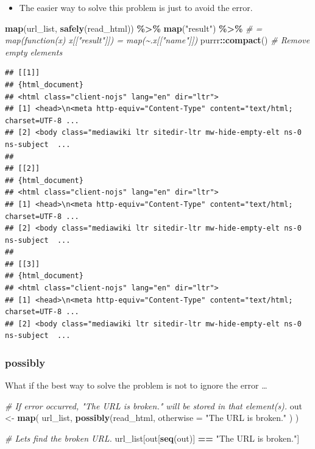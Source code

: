 \documentclass[
]{book}
\newenvironment{Shaded}{\begin{snugshade}}{\end{snugshade}}
\newcommand{\AttributeTok}[1]{\textcolor[rgb]{0.13,0.29,0.53}{#1}}
\newcommand{\CommentTok}[1]{\textcolor[rgb]{0.56,0.35,0.01}{\textit{#1}}}
\newcommand{\FunctionTok}[1]{\textcolor[rgb]{0.13,0.29,0.53}{\textbf{#1}}}
\newcommand{\NormalTok}[1]{#1}
\newcommand{\OtherTok}[1]{\textcolor[rgb]{0.56,0.35,0.01}{#1}}
\newcommand{\SpecialCharTok}[1]{\textcolor[rgb]{0.81,0.36,0.00}{\textbf{#1}}}
\newcommand{\StringTok}[1]{\textcolor[rgb]{0.31,0.60,0.02}{#1}}
\providecommand{\tightlist}{%
  \setlength{\itemsep}{0pt}\setlength{\parskip}{0pt}}
\begin{document}
\begin{itemize}
\tightlist
\item
  The easier way to solve this problem is just to avoid the error.
\end{itemize}

\begin{Shaded}
\begin{Highlighting}[]
\FunctionTok{map}\NormalTok{(url\_list, }\FunctionTok{safely}\NormalTok{(read\_html)) }\SpecialCharTok{\%\textgreater{}\%}
  \FunctionTok{map}\NormalTok{(}\StringTok{"result"}\NormalTok{) }\SpecialCharTok{\%\textgreater{}\%} 
  \CommentTok{\# = map(function(x) x[["result"]]) = map(\textasciitilde{}.x[["name"]])}
\NormalTok{  purrr}\SpecialCharTok{::}\FunctionTok{compact}\NormalTok{() }\CommentTok{\# Remove empty elements}
\end{Highlighting}
\end{Shaded}

\begin{verbatim}
## [[1]]
## {html_document}
## <html class="client-nojs" lang="en" dir="ltr">
## [1] <head>\n<meta http-equiv="Content-Type" content="text/html; charset=UTF-8 ...
## [2] <body class="mediawiki ltr sitedir-ltr mw-hide-empty-elt ns-0 ns-subject  ...
## 
## [[2]]
## {html_document}
## <html class="client-nojs" lang="en" dir="ltr">
## [1] <head>\n<meta http-equiv="Content-Type" content="text/html; charset=UTF-8 ...
## [2] <body class="mediawiki ltr sitedir-ltr mw-hide-empty-elt ns-0 ns-subject  ...
## 
## [[3]]
## {html_document}
## <html class="client-nojs" lang="en" dir="ltr">
## [1] <head>\n<meta http-equiv="Content-Type" content="text/html; charset=UTF-8 ...
## [2] <body class="mediawiki ltr sitedir-ltr mw-hide-empty-elt ns-0 ns-subject  ...
\end{verbatim}

\subsubsection{possibly}\label{possibly}

What if the best way to solve the problem is not to ignore the error \ldots{}

\begin{Shaded}
\begin{Highlighting}[]
\CommentTok{\# If error occurred, "The URL is broken." will be stored in that element(s).}
\NormalTok{out }\OtherTok{\textless{}{-}} \FunctionTok{map}\NormalTok{(}
\NormalTok{  url\_list,}
  \FunctionTok{possibly}\NormalTok{(read\_html,}
    \AttributeTok{otherwise =} \StringTok{"The URL is broken."}
\NormalTok{  )}
\NormalTok{)}

\CommentTok{\# Let\textquotesingle{}s find the broken URL.}
\NormalTok{url\_list[out[}\FunctionTok{seq}\NormalTok{(out)] }\SpecialCharTok{==} \StringTok{"The URL is broken."}\NormalTok{]}
\end{Highlighting}
\end{Shaded}
\end{document}
